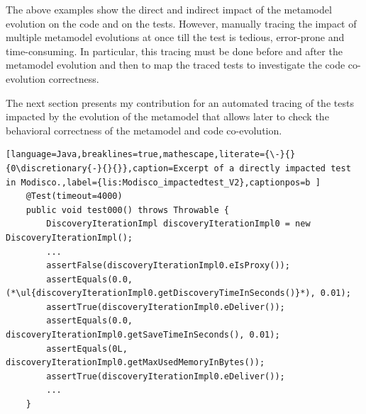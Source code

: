 	The above examples show the direct and indirect impact of the metamodel evolution on the code and on the tests. However, manually tracing the impact of multiple metamodel evolutions at once till the test is tedious, error-prone and time-consuming. In particular, this tracing must be done before and after the metamodel evolution and then to map the traced tests to investigate the code co-evolution correctness. 
	
	The next section presents my contribution for an automated tracing of the tests impacted by the evolution of the metamodel that allows later to check the behavioral correctness of the metamodel and code co-evolution. 
	



	




\begin{lstlisting}[language=Java,breaklines=true,mathescape,literate={\-}{}{0\discretionary{-}{}{}},caption=Excerpt of a directly impacted test in Modisco.,label={lis:Modisco_impactedtest_V2},captionpos=b ]
	@Test(timeout=4000)
	public void test000() throws Throwable {
		DiscoveryIterationImpl discoveryIterationImpl0 = new DiscoveryIterationImpl();
		...
		assertFalse(discoveryIterationImpl0.eIsProxy());
		assertEquals(0.0,  (*\ul{discoveryIterationImpl0.getDiscoveryTimeInSeconds()}*), 0.01);
		assertTrue(discoveryIterationImpl0.eDeliver());
		assertEquals(0.0, discoveryIterationImpl0.getSaveTimeInSeconds(), 0.01);
		assertEquals(0L, discoveryIterationImpl0.getMaxUsedMemoryInBytes());
		assertTrue(discoveryIterationImpl0.eDeliver());
		...
	}
	
	
\end{lstlisting}

